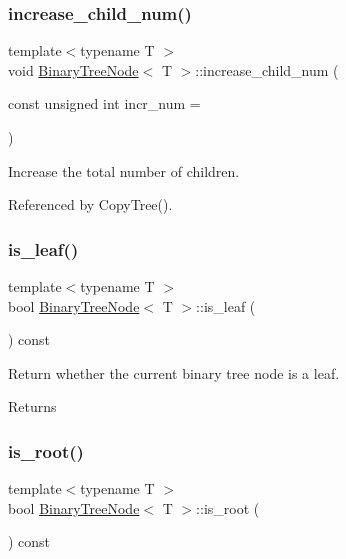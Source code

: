 \subsubsection{\texorpdfstring{increase\+\_\+child\+\_\+num()}{increase\_child\_num()}}
{\footnotesize\ttfamily template$<$typename T $>$ \\
void \hyperlink{classBinaryTreeNode}{Binary\+Tree\+Node}$<$ T $>$\+::increase\+\_\+child\+\_\+num (\begin{DoxyParamCaption}\item[{const unsigned int}]{incr\+\_\+num = {} }\end{DoxyParamCaption})}

Increase the total number of children. 

Referenced by Copy\+Tree().

\mbox{\label{classBinaryTreeNode_a9ef9e129737446b961cafd353b0a7370}} 
\subsubsection{\texorpdfstring{is\+\_\+leaf()}{is\_leaf()}}
{\footnotesize\ttfamily template$<$typename T $>$ \\
bool \hyperlink{classBinaryTreeNode}{Binary\+Tree\+Node}$<$ T $>$\+::is\+\_\+leaf (\begin{DoxyParamCaption}{ }\end{DoxyParamCaption}) const}

Return whether the current binary tree node is a leaf. \begin{DoxyReturn}{Returns}

\end{DoxyReturn}
\mbox{\label{classBinaryTreeNode_a7f24a34754ef61fb41004606a26cc7e1}} 
\subsubsection{\texorpdfstring{is\+\_\+root()}{is\_root()}}
{\footnotesize\ttfamily template$<$typename T $>$ \\
bool \hyperlink{classBinaryTreeNode}{Binary\+Tree\+Node}$<$ T $>$\+::is\+\_\+root (\begin{DoxyParamCaption}{ }\end{DoxyParamCaption}) const}

